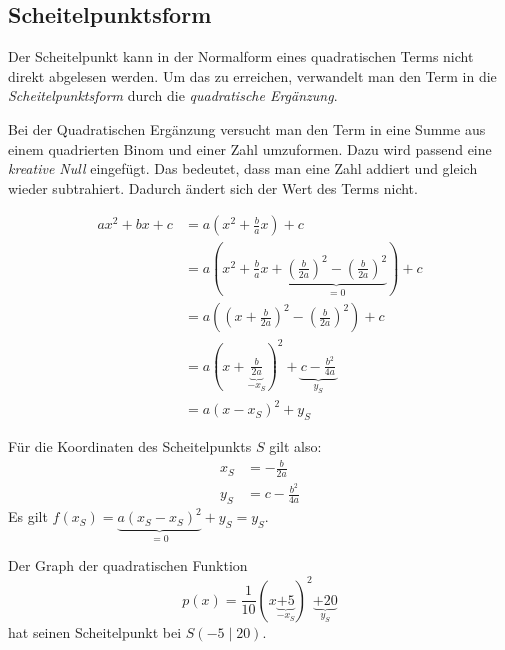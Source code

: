 \subsection{Scheitelpunktsform}

\begin{beme}
 Der Scheitelpunkt kann in der Normalform eines quadratischen Terms nicht direkt abgelesen werden. Um das zu erreichen, verwandelt man den Term in die \emph{Scheitelpunktsform} durch die \emph{quadratische Ergänzung}.
 
\end{beme}

\begin{regel}
 Bei der Quadratischen Ergänzung versucht man den Term in eine Summe aus einem quadrierten Binom und einer Zahl umzuformen.
 Dazu wird passend eine \emph{kreative Null} eingefügt. Das bedeutet, dass man eine Zahl addiert und gleich wieder subtrahiert. Dadurch ändert sich der Wert des Terms nicht.
 
 \begin{align*}
  ax^2+bx+c &= a\left(x^2+\frac{b}{a}x\right) +c \\
  &= a\left(x^2+\frac{b}{a}x + \underbrace{\left(\frac{b}{2a}\right)^2 - \left(\frac{b}{2a}\right)^2}_{=0} \right) + c \\
  &= a\left(\left(x+\frac{b}{2a}\right)^2 - \left(\frac{b}{2a}\right)^2 \right) +c \\
  &= a\left(x+\underbrace{\frac{b}{2a}}_{-x_S}\right)^2 + \underbrace {c - \frac{b^2}{4a}}_{y_S} \\
  &= a\left(x-x_S\right)^2 + y_S
 \end{align*}

 Für die Koordinaten des Scheitelpunkts \(S\) gilt also:
 \begin{align*}
  x_S &= -\frac{b}{2a} \\
  y_S &= c - \frac{b^2}{4a}
 \end{align*}
 Es gilt \(f(x_S) = \underbrace{a\left(x_S-x_S\right)^2}_{=0} + y_S = y_S\).
\end{regel}

\begin{bsp}
 Der Graph der quadratischen Funktion 
 \begin{equation*}
  p(x) = \frac{1}{10} (x\underbrace{+5}_{-x_S})^2 \underbrace{+20}_{y_S}
 \end{equation*}
 hat seinen Scheitelpunkt bei \(S (-5\mid 20)\).
\end{bsp}


